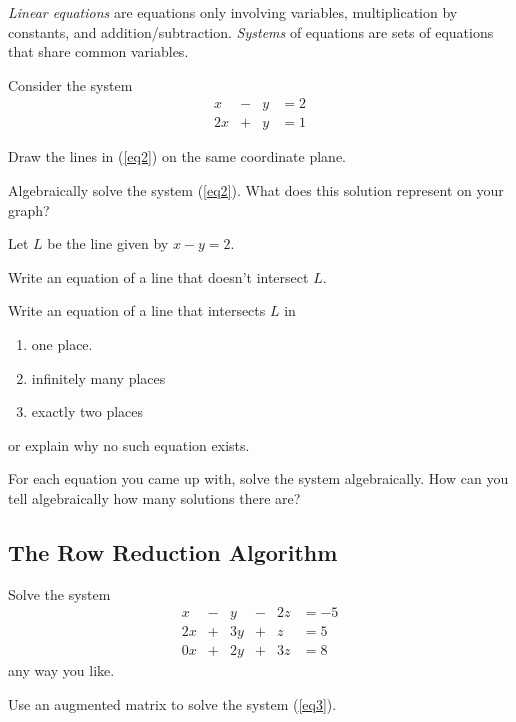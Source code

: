 \documentclass{problemset}
\begin{document}
	\emph{Linear equations} are equations only involving variables, 
	multiplication by constants, and addition/subtraction.  \emph{Systems}
	of equations are sets of equations that share common variables.

	\question
	Consider the system
	\begin{equation}\label{eq2}
		\begin{array}{rcrl}
			x &-&y &= 2\\
			2x &+&y &= 1
		\end{array}
	\end{equation}

	\begin{parts}
		\item Draw the lines in (\ref{eq2}) on the same coordinate plane.
		\item Algebraically solve the system (\ref{eq2}).  What does this 
		solution represent on your graph?
	\end{parts}
	
	\question
	Let $L$ be the line given by $x-y=2$.
	\begin{parts}
		\item Write an equation of a line that doesn't intersect $L$.
		\item Write an equation of a line that intersects $L$ in 
		\begin{enumerate}
			\item one place.
			\item infinitely many places
			\item exactly two places
		\end{enumerate}
		or explain why no such equation exists.
		\item For each equation you came up with, solve the system algebraically.
		How can you tell algebraically how many solutions there are?
	\end{parts}

\subsection*{The Row Reduction Algorithm}

	\question
	\begin{parts}
		\item Solve the system
		\begin{equation}\label{eq3}
			\begin{array}{rcrcrl}
				x&-&y&-&2z &= -5\\
				2x&+&3y&+&z &= 5\\
				0x&+&2y&+&3z &= 8
			\end{array}
		\end{equation}
		any way you like.

		\item Use an augmented matrix to solve the system (\ref{eq3}).
	\end{parts}
\end{document}

